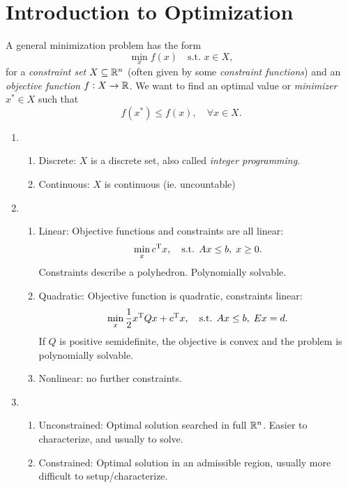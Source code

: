 \documentclass{article}
\begin{document}
\section{Introduction to Optimization}

\label{s:optimization-form}

A general minimization problem has the form
\begin{equation*}
  \min_{x} f(x) \quad \text{s.t. } x \in X,
\end{equation*}
for a \emph{constraint set} \(X \subseteq \mathbb{R}^n\) (often given by some \emph{constraint functions})
and an \emph{objective function} \(f: X \to \mathbb{R}\).  We want to find an optimal value or
\emph{minimizer} \(x^* \in X\) such that
\begin{equation*}
  f(x^*) \leq f(x), \quad \forall x \in X.
\end{equation*}


\label{s:optimization-types}

\begin{enumerate}
\item
  \begin{enumerate}
  \item Discrete: \(X\) is a discrete set, also called \emph{integer programming}.
  \item Continuous: \(X\) is continuous (ie. uncountable)
  \end{enumerate}
\item
  \begin{enumerate}
  \item Linear: Objective functions and constraints are all linear:
    \begin{equation*}
      \min_x c^{\mathrm{T}} x, \quad\text{s.t. } Ax \leq b,\; x \geq 0.
    \end{equation*}
    Constraints describe a polyhedron.  Polynomially solvable.
  \item Quadratic: Objective function is quadratic, constraints linear:
    \begin{equation*}
      \min_x \frac{1}{2}x^{\mathrm{T}} Q x + c^{\mathrm{T}} x, \quad\text{s.t. } Ax \leq b,\; Ex = d.
    \end{equation*}
    If \(Q\) is positive semidefinite, the objective is convex and the problem is polynomially
    solvable.
  \item Nonlinear: no further constraints.
  \end{enumerate}
\item
  \begin{enumerate}
  \item Unconstrained: Optimal solution searched in full \(\mathbb{R}^n\). Easier to characterize, and
    usually to solve.
  \item Constrained: Optimal solution in an admissible region, usually more difficult to
    setup/characterize.
  \end{enumerate}
\end{enumerate}
\end{document}
